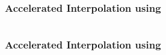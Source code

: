 \begin{frame}[t]
	\frametitle{Accelerated Interpolation using \qvasr}
	\begin{columns}
		\begin{column}{0.35\textwidth}
			\resizebox{0.8\textwidth}{!}{}
		\end{column}
		\begin{column}{0.55\textwidth}
			\resizebox{0.4\textwidth}{!}{}
		\end{column}
	\end{columns}
\end{frame}

\begin{frame}[t]
	\frametitle{Accelerated Interpolation using \qvasr}
	\begin{columns}
		\begin{column}{0.3\textwidth}
			\resizebox{0.8\textwidth}{!}{}
		\end{column}
		\begin{column}{0.3\textwidth}
				\resizebox{\textwidth}{!}{}
		\end{column}
		\begin{column}{0.3\textwidth}
				\onslide<9->{\resizebox{0.65\textwidth}{!}{}}
		\end{column}
	\end{columns}
	\begin{center}
	\end{center}
\end{frame}

